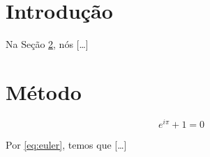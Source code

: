 \documentclass{article}
\begin{document}
\section{Introdução}
\label{sec:intro}

Na Seção \ref{sec:metodo}, nós [\ldots]

\section{Método}
\label{sec:metodo}

\begin{equation}
\label{eq:euler}
  e^{i\pi} + 1 = 0
\end{equation}

Por \eqref{eq:euler}, temos que [\ldots]
\end{document}
